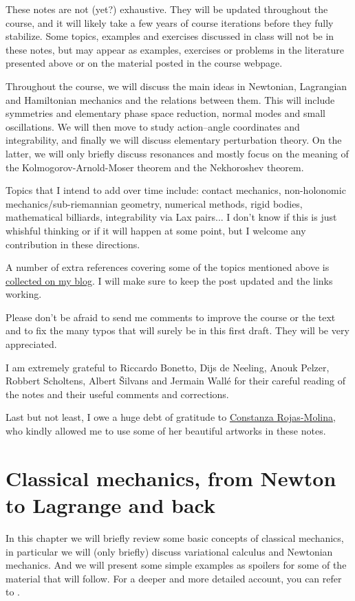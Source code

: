 \documentclass[english,fontsize=11pt,paper=a5,oneside]{scrbook}
\theoremstyle{definition}
\begin{document}
These notes are not (yet?) exhaustive.
They will be updated throughout the course, and it will likely take a few years of course iterations before they fully stabilize.
Some topics, examples and exercises discussed in class will not be in these notes, but may appear as examples, exercises or problems in the literature presented above or on the material posted in the course webpage.

Throughout the course, we will discuss the main ideas in Newtonian, Lagrangian and Hamiltonian mechanics and the relations between them.
This will include symmetries and elementary phase space reduction, normal modes and small oscillations.
We will then move to study action--angle coordinates and integrability, and finally we will discuss elementary perturbation theory.
On the latter, we will only briefly discuss resonances and mostly focus on the meaning of the Kolmogorov-Arnold-Moser theorem and the Nekhoroshev theorem.

Topics that I intend to add over time include: contact mechanics, non-holonomic mechanics/sub-riemannian geometry, numerical methods, rigid bodies, mathematical billiards, integrability via Lax pairs... I don't know if this is just whishful thinking or if it will happen at some point, but I welcome any contribution in these directions.

A number of extra references covering some of the topics mentioned above is \href{https://www.mseri.me/links-from-hm/}{collected on my blog}. I will make sure to keep the post updated and the links working. \medskip

Please don't be afraid to send me comments to improve the course or the text and to fix the many typos that will surely be in this first draft. They will be very appreciated.

I am extremely grateful to Riccardo Bonetto, Dijs de Neeling, Anouk Pelzer, Robbert Scholtens, Albert \v{S}ilvans and Jermain Wall\'e for their careful reading of the notes and their useful comments and corrections.

Last but not least, I owe a huge debt of gratitude to \href{https://crojasmolina.com}{Constanza Rojas-Molina}, who kindly allowed me to use some of her beautiful artworks in these notes.

\chapter{Classical mechanics, from Newton to Lagrange and back}

In this chapter we will briefly review some basic concepts of classical mechanics, in particular we will (only briefly) discuss variational calculus and Newtonian mechanics.
And we will present some simple examples as spoilers for some of the material that will follow.
For a deeper and more detailed account, you can refer to \cite{book:arnold,book:knauf}.
\end{document}
